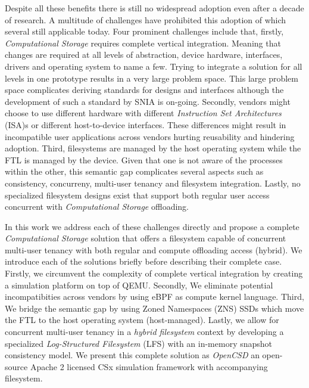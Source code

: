 \documentclass[conference]{IEEEtran}
\begin{document}

Despite all these benefits there is still no widespread adoption even after a
decade of research\cite{lukken2021past}. A multitude of challenges
have prohibited this adoption of which several still applicable today. Four
prominent challenges include that, firstly, \textit{Computational Storage}
requires complete vertical integration. Meaning that changes are required at all
levels of abstraction, device hardware, interfaces, drivers and operating system
to name a few. Trying to integrate a solution for all levels in one prototype
results in a very large problem space. This large problem space complicates
deriving standards for designs and interfaces although the development of such a
standard by SNIA is on-going\cite{snia-model}. Secondly, vendors might choose to
use different hardware with different
\textit{Instruction Set Architectures} (ISA)s or different host-to-device
interfaces. These differences might result in incompatible user applications
across vendors hurting reusability and hindering adoption. Third, filesystems
are managed by the host operating system while the FTL is
managed by the device. Given that one is not aware of the processes within the
other, this semantic gap complicates several aspects such as consistency,
concurreny, multi-user tenancy and filesystem integration. Lastly, no
specialized filesystem designs exist that support both regular user access
concurrent with \textit{Computational Storage} offloading.


In this work we address each of these challenges directly and propose a
complete \textit{Computational Storage} solution that offers a filesystem
capable of concurrent multi-user tenancy with both regular and compute
offloading access (hybrid). We introduce each of the solutions briefly before
describing their complete case. Firstly, we circumvent the complexity of
complete vertical integration by creating a simulation platform on top of
QEMU\cite{qemu}. Secondly, We eliminate potential incompatibities across vendors
by using eBPF\cite{what-ebpf} as compute kernel language. Third, We bridge the
semantic gap by using Zoned Namespaces (ZNS)\cite{zns} SSDs which move the FTL
to the host operating system (host-managed). Lastly, we allow for concurrent
multi-user tenancy in a \textit{hybrid filesystem} context by developing a
specialized \textit{Log-Structured Filesystem} (LFS)\cite{Rosenblum1992TheDA}
with an in-memory snapshot consistency model\cite{Viotti2016ConsistencyIN}. We
present this complete solution as \textit{OpenCSD} an open-source Apache 2
licensed CSx simulation framework with accompanying filesystem\cite{qemu-csd}.
\end{document}
